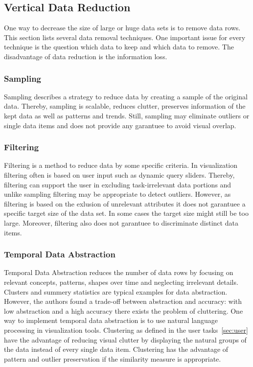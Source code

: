 \subsection{Vertical Data Reduction}
One way to decrease the size of large or huge data sets is to remove data rows. This section lists several data removal techniques. One important issue for every technique is the question which data to keep and which data to remove. The disadvantage of data reduction is the information loss.
\subsubsection*{Sampling}
Sampling describes a strategy to reduce data by creating a sample of the original data. Thereby, sampling is scalable, reduces clutter, preserves information of the kept data as well as patterns and trends\cite{PiringerHarald2011}. Still, sampling may eliminate outliers or single data items and does not provide any garantuee to avoid visual overlap. 
\subsubsection*{Filtering}
Filtering is a method to reduce data by some specific criteria. In visualization filtering often is based on user input such as dynamic query sliders. Thereby, filtering can support the user in excluding task-irrelevant data portions and unlike sampling filtering may be appropriate to detect outliers. However, as filtering is based on the exlusion of unrelevant attributes it does not garantuee a specific target size of the data set. In some cases the target size might still be too large. Moreover, filtering also does not garantuee to discriminate distinct data items\cite{PiringerHarald2011}.
\subsubsection*{Temporal Data Abstraction}
Temporal Data Abstraction\cite{Aigner2011} reduces the number of data rows by focusing on relevant concepts, patterns, shapes over time and neglecting irrelevant details. Clusters and summery statistics\cite{PiringerHarald2011} are typical examples for data abstraction. However, the authors found a trade-off between abstraction and accuracy: with low abstraction and a high accuracy there exists the problem of cluttering. 
One way to implement temporal data abstraction is to use natural language processing in visualization tools. 
Clustering as defined in the user tasks~\ref{sec:user} have the advantage of reducing visual clutter by displaying the natural groups of the data instead of every single data item. Clustering has the advantage of pattern and outlier preservation if the similarity measure is appropriate.
